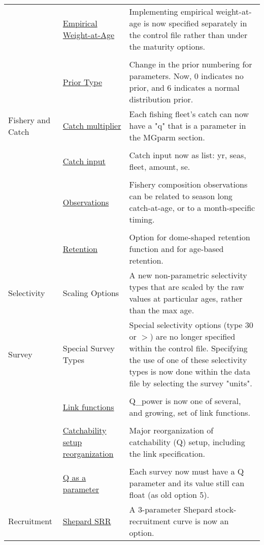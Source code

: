 \documentclass[12pt]{article}
\begin{document}
\begin{center}
\begin{longtable}{p{2cm} p{3cm} p{10cm}}
	& \hyperlink{WAAparm} {Empirical Weight-at-Age} & Implementing empirical weight-at-age is now specified separately in the control file rather than under the maturity options.\\
	\\
	& \hyperlink{Priors}{Prior Type} & Change in the prior numbering for parameters.  Now, 0 indicates no prior, and 6 indicates a normal distribution prior.\\
	\hline
	Fishery and Catch & 
	\hyperlink{CatchMult}{Catch multiplier} & 
	Each fishing fleet's catch can now have a "q" that is a parameter in the MGparm section.\\
	\\						
	& \hyperlink{CatchFormat}{Catch input} & 
	Catch input now as list:  yr, seas, fleet, amount, se. \\
	\\						
	& \hyperlink{CompTiming}{Observations} & 
	Fishery composition observations can be related to season long catch-at-age, or to a month-specific timing.\\
	\\					
	& \hyperlink{DomeRetention}{Retention} & 
	Option for dome-shaped retention function and for age-based retention. \\
	\hline
	Selectivity 
	& Scaling Options& 	
	A new non-parametric selectivity types that are scaled by the raw values at particular ages, rather than the max age.\\
	\hline
	Survey
	& Special Survey Types & 
	Special selectivity options (type 30 or $>$) are no longer specified within the control file.  Specifying the use of one of these selectivity types is now done within the data file by selecting the survey "units". \\  
	\\
	& \hyperlink{Qsetup}{Link functions} & 
	Q\_power is now one of several, and growing, set of link functions. \\
	\\						
	& \hyperlink{Qsetup}{Catchability setup reorganization} & 
	Major reorganization of catchability (Q) setup, including the link specification. \\
	\\					
	& \multicolumn{1}{l}{\hyperlink{Qsetup}{Q as a parameter}} & 
	Each survey now must have a Q parameter and its value still can float (as old option 5).\\
	\hline
	Recruitment
	& \hyperlink{Shepard}{Shepard SRR} & 
	A 3-parameter Shepard stock-recruitment curve is now an option.\\

\end{longtable}
\end{center}
\end{document}
